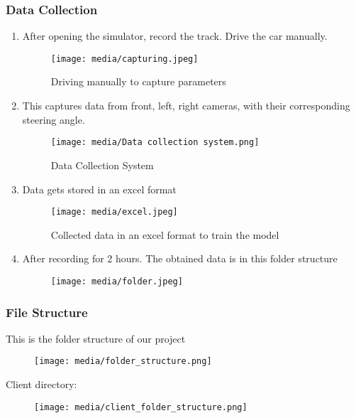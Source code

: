 \documentclass[ 12pt,a4paper,twocolumn,fleqn]{article}
\begin{document}
\subsubsection{Data Collection}
\begin{enumerate}
    \item After opening the simulator, record the track. Drive the car manually. 
    \begin{figure}[H]
    \texttt{[image: media/capturing.jpeg]}
    \centering
    \caption{Driving manually to capture parameters}
    \end{figure}
    \item This captures data from front, left, right cameras, with their corresponding steering angle. 
    \begin{figure}[H]
    \texttt{[image: media/Data collection system.png]}
    \centering
    \caption{Data Collection System}
    \end{figure}
    \item Data gets stored in an excel format
    \begin{figure}[H]
    \texttt{[image: media/excel.jpeg]}
    \centering
    \caption{Collected data in an excel format to train the model}
    \end{figure}
    \item After recording for 2 hours. The obtained data is in this folder structure
    \begin{figure}[H]
    \texttt{[image: media/folder.jpeg]}
    \centering
    \end{figure}
\end{enumerate}

\subsubsection{File Structure}
This is the folder structure of our project
\begin{figure}[H]
\texttt{[image: media/folder\_structure.png]}
\centering
\end{figure}
Client directory:
\begin{figure}[H]
\texttt{[image: media/client\_folder\_structure.png]}
\centering
\end{figure}
\end{document}
